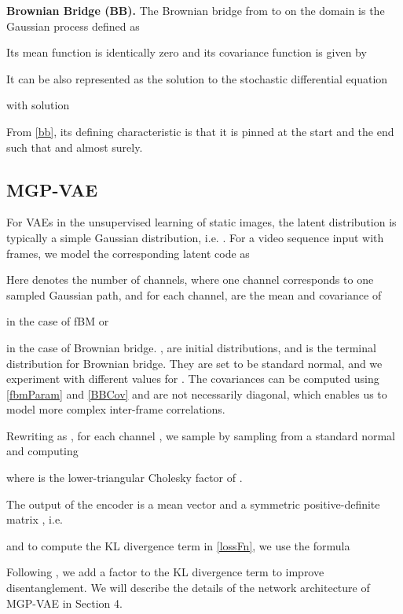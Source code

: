 \documentclass[runningheads]{llncs}
\begin{document}
   \noindent \textbf{Brownian Bridge (BB). }
   The Brownian bridge \cite{glasserman,Karatzas1987BrownianMA} from  to  on the domain  is the Gaussian process defined as
   
   Its mean function is identically zero and its covariance function is given by 
   
   It can be also represented as the solution to the stochastic differential equation \cite{Karatzas1987BrownianMA}
   
   with solution
   
   From \eqref{bb}, its defining characteristic is that it is pinned at the start and the end such that  and  almost surely.
   
   \subsection{MGP-VAE} \label{section:sampling}
   For VAEs in the unsupervised learning of static images, the latent distribution  is typically a simple Gaussian distribution, i.e. . For a video sequence input  with  frames, we model the corresponding latent code as   
   
   Here  denotes the number of channels, where one channel corresponds to one sampled Gaussian path, and for each channel,  are the mean and covariance of 
   
   in the case of fBM or
   
   in the case of Brownian bridge. ,  are initial distributions, and  is the terminal distribution for Brownian bridge. They are set to be standard normal, and we experiment with different values for . The covariances can be computed using \eqref{fbmParam} and \eqref{BBCov} and are not necessarily diagonal, which enables us to model more complex inter-frame correlations. \par 

   Rewriting  as , for each channel , we sample  by sampling from a standard normal  and computing
   
   where  is the lower-triangular Cholesky factor of . \par 

   The output of the encoder is a mean vector  and a symmetric positive-definite matrix , i.e.
   
   and to compute the KL divergence term in \eqref{lossFn}, we use the formula
   \small 
   
   \normalsize
   Following \cite{Higgins2017betaVAELB}, we add a  factor to the KL divergence term to improve disentanglement. We will describe the details of the network architecture of MGP-VAE in Section 4.
\end{document}
